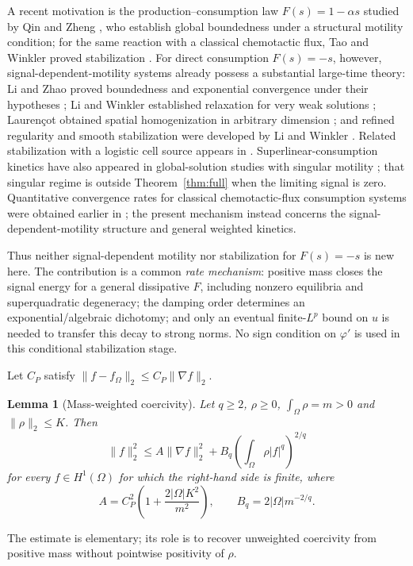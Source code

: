 \documentclass[final,5p,times,twocolumn]{elsarticle}
\newtheorem{lemma}[theorem]{Lemma}
\newcommand{\Om}{\Omega}
\newcommand{\norm}[1]{\lVert#1\rVert}
\begin{document}
A recent motivation is the production--consumption law $F(s)=1-\alpha s$ studied by Qin and Zheng \cite{QinZheng2026}, who establish global boundedness under a structural motility condition; for the same reaction with a classical chemotactic flux, Tao and Winkler proved stabilization \cite{TaoWinkler2025}. For direct consumption $F(s)=-s$, however, signal-dependent-motility systems already possess a substantial large-time theory: Li and Zhao proved boundedness and exponential convergence under their hypotheses \cite{LiZhao2021}; Li and Winkler established relaxation for very weak solutions \cite{LiWinkler2023}; Lauren\c{c}ot obtained spatial homogenization in arbitrary dimension \cite{Laurencot2023}; and refined regularity and smooth stabilization were developed by Li and Winkler \cite{LiWinkler2024}. Related stabilization with a logistic cell source appears in \cite{LiWangPan2021}. Superlinear-consumption kinetics have also appeared in global-solution studies with singular motility \cite{ZhangLi2025}; that singular regime is outside Theorem~\ref{thm:full} when the limiting signal is zero. Quantitative convergence rates for classical chemotactic-flux consumption systems were obtained earlier in \cite{ZhangLi2015}; the present mechanism instead concerns the signal-dependent-motility structure and general weighted kinetics.

Thus neither signal-dependent motility nor stabilization for $F(s)=-s$ is new here. The contribution is a common \emph{rate mechanism}: positive mass closes the signal energy for a general dissipative $F$, including nonzero equilibria and superquadratic degeneracy; the damping order determines an exponential/algebraic dichotomy; and only an eventual finite-$L^p$ bound on $u$ is needed to transfer this decay to strong norms. No sign condition on $\varphi'$ is used in this conditional stabilization stage.

Let $C_P$ satisfy $\norm{f-f_\Om}_2\le C_P\norm{\nabla f}_2$.

\begin{lemma}[Mass-weighted coercivity]\label{lem:coerc}
Let $q\ge2$, $\rho\ge0$, $\int_\Om\rho=m>0$ and $\norm{\rho}_2\le K$. Then
\begin{equation}\label{coerc}
\norm f_2^2\le A\norm{\nabla f}_2^2+B_q\left(\int_\Om\rho|f|^q\right)^{2/q}
\end{equation}
for every $f\in H^1(\Om)$ for which the right-hand side is finite, where
\[
A=C_P^2\left(1+\frac{2|\Om|K^2}{m^2}\right),\qquad B_q=2|\Om|m^{-2/q}.
\]
\end{lemma}
The estimate is elementary; its role is to recover unweighted coercivity from positive mass without pointwise positivity of $\rho$.
\end{document}
